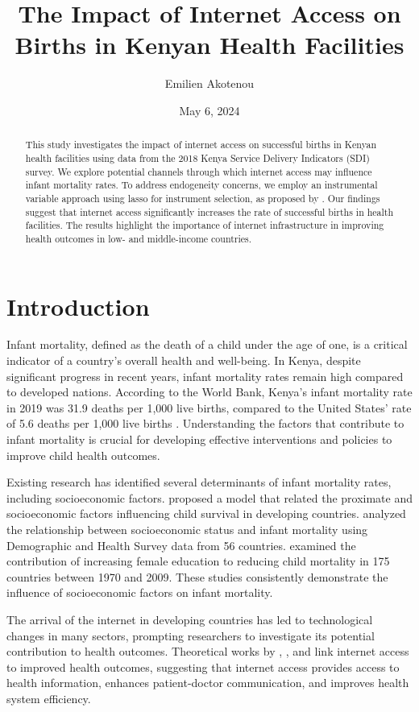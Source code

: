 \documentclass[12pt]{article}
\title{The Impact of Internet Access on Births in Kenyan Health Facilities}
\author{Emilien Akotenou}
\date{May 6, 2024}
\begin{document}
\maketitle

\begin{abstract}
This study investigates the impact of internet access on successful births in Kenyan health facilities using data from the 2018 Kenya Service Delivery Indicators (SDI) survey. We explore potential channels through which internet access may influence infant mortality rates. To address endogeneity concerns, we employ an instrumental variable approach using lasso for instrument selection, as proposed by \citet{Belloni2012}. Our findings suggest that internet access significantly increases the rate of successful births in health facilities. The results highlight the importance of internet infrastructure in improving health outcomes in low- and middle-income countries.
\end{abstract}


\section{Introduction}
Infant mortality, defined as the death of a child under the age of one, is a critical indicator of a country's overall health and well-being. In Kenya, despite significant progress in recent years, infant mortality rates remain high compared to developed nations. According to the World Bank, Kenya's infant mortality rate in 2019 was 31.9 deaths per 1,000 live births, compared to the United States' rate of 5.6 deaths per 1,000 live births \citep{WorldBank2021}. Understanding the factors that contribute to infant mortality is crucial for developing effective interventions and policies to improve child health outcomes.

Existing research has identified several determinants of infant mortality rates, including socioeconomic factors. \citet{Mosley1984} proposed a model that related the proximate and socioeconomic factors influencing child survival in developing countries. \citet{Rutstein2000} analyzed the relationship between socioeconomic status and infant mortality using Demographic and Health Survey data from 56 countries. \citet{Gakidou2010} examined the contribution of increasing female education to reducing child mortality in 175 countries between 1970 and 2009. These studies consistently demonstrate the influence of socioeconomic factors on infant mortality.

The arrival of the internet in developing countries has led to technological changes in many sectors, prompting researchers to investigate its potential contribution to health outcomes. Theoretical works by \citet{DuttaBergman2004}, \citet{Blaya2010}, and \citet{Piette2012} link internet access to improved health outcomes, suggesting that internet access provides access to health information, enhances patient-doctor communication, and improves health system efficiency.
\end{document}
